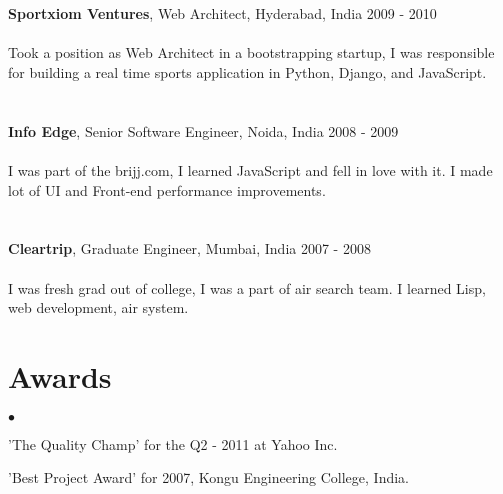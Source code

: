 \documentclass[margin, line, 10pt]{res}
\newenvironment{list2}{
  \begin{list}{$\bullet$}{%
      \setlength{\itemsep}{0in}
      \setlength{\parsep}{0in} \setlength{\parskip}{0in}
      \setlength{\topsep}{0in} \setlength{\partopsep}{0in}
      \setlength{\leftmargin}{0.2in}}}{\end{list}}
\begin{document}
\begin{resume}
\section{}
{\Large {\bf Sportxiom Ventures}}, Web Architect, Hyderabad, India  \hfill 2009 - 2010\\
\vspace{-.3cm}\\
Took a position as Web Architect in a bootstrapping startup, I was responsible for building a real time sports application in Python, Django, and JavaScript.
\vspace{.05cm}

\section{}
{\Large {\bf Info Edge}}, Senior Software Engineer,  Noida, India \hfill 2008 - 2009 \\
\vspace{-.3cm}\\
I was part of the brijj.com, I learned JavaScript and fell in love with it. I made lot of UI and Front-end performance improvements.
\vspace{.05cm}


\section{}
{\Large {\bf Cleartrip}}, Graduate Engineer,  Mumbai, India \hfill 2007 - 2008\\
\vspace{-.3cm}\\
I was fresh grad out of college, I was a part of air search team. I learned Lisp, web development, air system.
\vspace{.05cm}

\section{Awards}
\begin{list2}
\item 'The Quality Champ' for the Q2 - 2011 at Yahoo Inc.
\item 'Best Project Award' for 2007, Kongu Engineering College, India.
\end{list2}

\end{resume}
\end{document}
